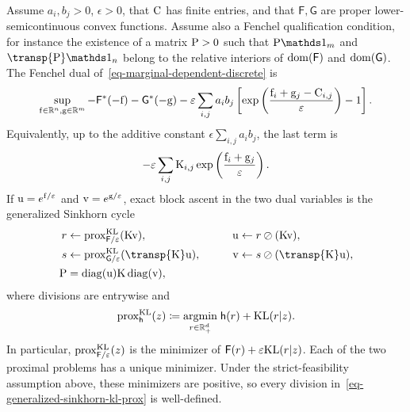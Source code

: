 \begin{prop}\label{prop-marginal-dependent-dual-scaling}
Assume $a_i,b_j>0$, $\epsilon>0$, that $\C$ has finite entries, and that $\mathsf F,\mathsf G$ are proper lower-semicontinuous convex functions. Assume also a Fenchel qualification condition, for instance the existence of a matrix $\P>0$ such that $\P\ones_m$ and $\transp{\P}\ones_n$ belong to the relative interiors of $\dom(\mathsf F)$ and $\dom(\mathsf G)$. The Fenchel dual of~\eqref{eq-marginal-dependent-discrete} is
\begin{equation}\label{eq-marginal-dependent-dual}
\sup_{\fD\in\RR^n,\gD\in\RR^m}
-
\mathsf F^*(-\fD)
-
\mathsf G^*(-\gD)
-
\epsilon\sum_{i,j}a_i b_j
\left[
\exp\left(\frac{\fD_i+\gD_j-\C_{i,j}}{\epsilon}\right)-1
\right].
\end{equation}
Equivalently, up to the additive constant $\epsilon\sum_{i,j}a_i b_j$, the last term is
\[
-
\epsilon\sum_{i,j}\K_{i,j}
\exp\left(\frac{\fD_i+\gD_j}{\epsilon}\right).
\]
If $\uD=e^{\fD/\epsilon}$ and $\vD=e^{\gD/\epsilon}$, exact block ascent in the two dual variables is the generalized Sinkhorn cycle
\begin{equation}\label{eq-generalized-sinkhorn-kl-prox}
\begin{aligned}
r &\leftarrow \prox_{\mathsf F/\epsilon}^{\KLD}(\K\vD),
&\qquad
\uD &\leftarrow r\oslash(\K\vD),\\
s &\leftarrow \prox_{\mathsf G/\epsilon}^{\KLD}(\transp{\K}\uD),
&\qquad
\vD &\leftarrow s\oslash(\transp{\K}\uD),\\
\P&=\diag(\uD)\K\diag(\vD),
\end{aligned}
\end{equation}
where divisions are entrywise and
\begin{equation}\label{eq-kl-prox-marginal}
\prox_{\mathsf h}^{\KLD}(z)
\eqdef
\uargmin{r\in\RR_+^d}
\mathsf h(r)+\KLD(r|z).
\end{equation}
In particular, $\prox_{\mathsf F/\epsilon}^{\KLD}(z)$ is the minimizer of $\mathsf F(r)+\epsilon\KLD(r|z)$. Each of the two proximal problems has a unique minimizer. Under the strict-feasibility assumption above, these minimizers are positive, so every division in~\eqref{eq-generalized-sinkhorn-kl-prox} is well-defined.
\end{prop}
